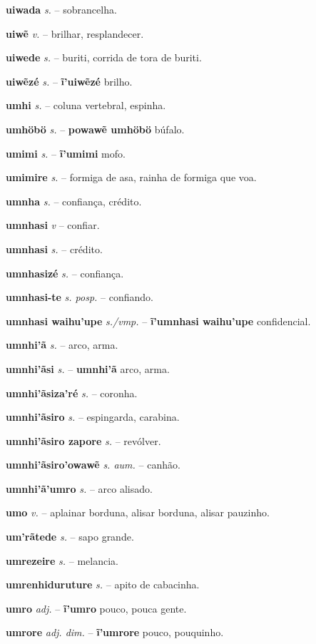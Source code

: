 \textbf{uiwada} \textit{s.} -- sobrancelha.

\textbf{uiwẽ} \textit{v.} -- brilhar, resplandecer.

\textbf{uiwede} \textit{s.} -- buriti, corrida de tora de buriti.

\textbf{uiwẽzé} \textit{s.} -- \textbf{ĩ'uiwẽzé} brilho.

\textbf{umhi} \textit{s.} -- coluna vertebral, espinha.

\textbf{umhöbö} \textit{s.} -- \textbf{powawẽ umhöbö} búfalo.

\textbf{umimi} \textit{s.} -- \textbf{ĩ'umimi} mofo.

\textbf{umimire} \textit{s.} -- formiga de asa, rainha de formiga que voa.

\textbf{umnha} \textit{s.} -- confiança, crédito.

\textbf{umnhasi} \textit{v} -- confiar.

\textbf{umnhasi} \textit{s.} -- crédito.

\textbf{umnhasizé} \textit{s.} -- confiança.

\textbf{umnhasi-te} \textit{s. posp.} -- confiando.

\textbf{umnhasi waihu'upe} \textit{s./vmp.} -- \textbf{ĩ'umnhasi waihu'upe} confidencial.

\textbf{umnhi'ã} \textit{s.} -- arco, arma.

\textbf{umnhi'ãsi} \textit{s.} -- \textbf{umnhi'ã} arco, arma.

\textbf{umnhi'ãsiza'ré} \textit{s.} -- coronha.

\textbf{umnhi'ãsiro} \textit{s.} -- espingarda, carabina.

\textbf{umnhi'ãsiro zapore} \textit{s.} -- revólver.

\textbf{umnhi'ãsiro'owawẽ} \textit{s. aum.} -- canhão.

\textbf{umnhi'ã'umro} \textit{s.} -- arco alisado.

\textbf{umo} \textit{v.} -- aplainar borduna, alisar borduna, alisar pauzinho.

\textbf{um'rãtede} \textit{s.} -- sapo grande.

\textbf{umrezeire} \textit{s.} -- melancia.

\textbf{umrenhiduruture} \textit{s.} -- apito de cabacinha.

\textbf{umro} \textit{adj.} -- \textbf{ĩ'umro} pouco, pouca gente.

\textbf{umrore} \textit{adj. dim.} -- \textbf{ĩ'umrore} pouco, pouquinho.

